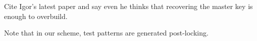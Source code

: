 Cite Igor's latest paper and say even he thinks that recovering the master key is enough to overbuild.

Note that in our scheme, test patterns are generated post-locking.